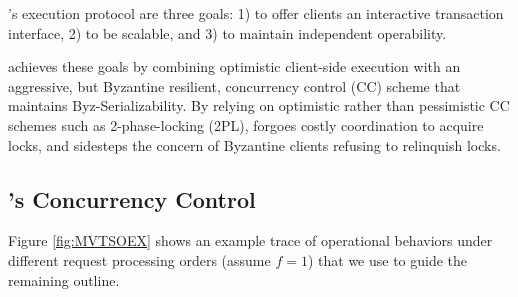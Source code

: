 
\sys{}'s execution protocol are three goals: 1) to offer clients an interactive transaction interface, 2) to be scalable, and 3) to maintain independent operability.

\sys{} achieves these goals by combining optimistic client-side execution with an aggressive, but Byzantine resilient, concurrency control (CC) scheme that maintains Byz-Serializability. 
By relying on optimistic rather than pessimistic CC schemes such as 2-phase-locking (2PL), \sys{} forgoes costly coordination to acquire locks, and sidesteps the concern of Byzantine clients refusing to relinquish locks.

\subsection{\sys{}'s Concurrency Control}

 
Figure \ref{fig:MVTSOEX} shows an example trace of \sys operational behaviors under different request processing orders (assume $f=1$) that we use to guide the remaining outline.

